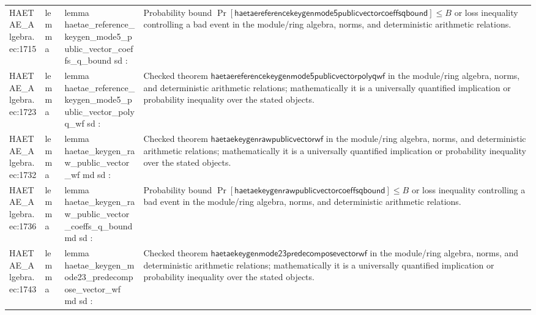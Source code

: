 \documentclass[10pt]{article}
\begin{document}
\begin{longtable}{L{0.11\textwidth}L{0.055\textwidth}L{0.385\textwidth}L{0.41\textwidth}}
HAETAE\_\allowbreak{}Algebra.\allowbreak{}ec:\allowbreak{}1715 & lemma & {\ttfamily\scriptsize lemma haetae\_\allowbreak{}reference\_\allowbreak{}keygen\_\allowbreak{}mode5\_\allowbreak{}public\_\allowbreak{}vector\_\allowbreak{}coeffs\_\allowbreak{}q\_\allowbreak{}bound sd :} & Probability bound $\Pr[\mathsf{haetaereferencekeygenmode5publicvectorcoeffsqbound}]\le B$ or loss inequality controlling a bad event in the module/ring algebra, norms, and deterministic arithmetic relations. \\
HAETAE\_\allowbreak{}Algebra.\allowbreak{}ec:\allowbreak{}1723 & lemma & {\ttfamily\scriptsize lemma haetae\_\allowbreak{}reference\_\allowbreak{}keygen\_\allowbreak{}mode5\_\allowbreak{}public\_\allowbreak{}vector\_\allowbreak{}polyq\_\allowbreak{}wf sd :} & Checked theorem $\mathsf{haetaereferencekeygenmode5publicvectorpolyqwf}$ in the module/ring algebra, norms, and deterministic arithmetic relations; mathematically it is a universally quantified implication or probability inequality over the stated objects. \\
HAETAE\_\allowbreak{}Algebra.\allowbreak{}ec:\allowbreak{}1732 & lemma & {\ttfamily\scriptsize lemma haetae\_\allowbreak{}keygen\_\allowbreak{}raw\_\allowbreak{}public\_\allowbreak{}vector\_\allowbreak{}wf md sd :} & Checked theorem $\mathsf{haetaekeygenrawpublicvectorwf}$ in the module/ring algebra, norms, and deterministic arithmetic relations; mathematically it is a universally quantified implication or probability inequality over the stated objects. \\
HAETAE\_\allowbreak{}Algebra.\allowbreak{}ec:\allowbreak{}1736 & lemma & {\ttfamily\scriptsize lemma haetae\_\allowbreak{}keygen\_\allowbreak{}raw\_\allowbreak{}public\_\allowbreak{}vector\_\allowbreak{}coeffs\_\allowbreak{}q\_\allowbreak{}bound md sd :} & Probability bound $\Pr[\mathsf{haetaekeygenrawpublicvectorcoeffsqbound}]\le B$ or loss inequality controlling a bad event in the module/ring algebra, norms, and deterministic arithmetic relations. \\
HAETAE\_\allowbreak{}Algebra.\allowbreak{}ec:\allowbreak{}1743 & lemma & {\ttfamily\scriptsize lemma haetae\_\allowbreak{}keygen\_\allowbreak{}mode23\_\allowbreak{}predecompose\_\allowbreak{}vector\_\allowbreak{}wf md sd :} & Checked theorem $\mathsf{haetaekeygenmode23predecomposevectorwf}$ in the module/ring algebra, norms, and deterministic arithmetic relations; mathematically it is a universally quantified implication or probability inequality over the stated objects. \\

\end{longtable}
\end{document}
